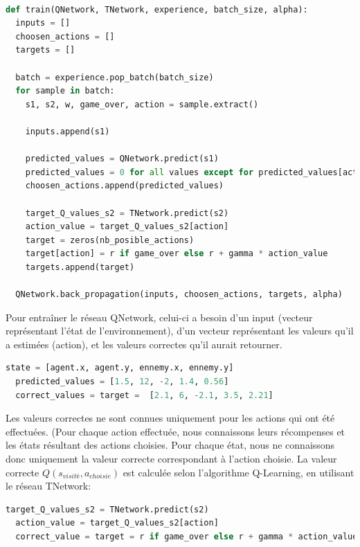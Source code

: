 \documentclass[11pt,a4paper]{report}
\begin{document}
  \begin{lstlisting}[language=python]
  
def train(QNetwork, TNetwork, experience, batch_size, alpha):
  inputs = []
  choosen_actions = []
  targets = []
 
  batch = experience.pop_batch(batch_size)
  for sample in batch:
    s1, s2, w, game_over, action = sample.extract()

    inputs.append(s1)
    
    predicted_values = QNetwork.predict(s1)
    predicted_values = 0 for all values except for predicted_values[action]
    choosen_actions.append(predicted_values)
    
    target_Q_values_s2 = TNetwork.predict(s2)
    action_value = target_Q_values_s2[action]
    target = zeros(nb_posible_actions)
    target[action] = r if game_over else r + gamma * action_value
    targets.append(target)
    
  QNetwork.back_propagation(inputs, choosen_actions, targets, alpha)
    \end{lstlisting} 
  
  \par Pour entraîner le réseau QNetwork, celui-ci a besoin d'un input (vecteur représentant l'état de l'environnement), d'un vecteur représentant les valeurs qu'il a estimées (action), et les valeurs correctes qu'il aurait retourner. 
  
  \begin{lstlisting}[language=python]
  state = [agent.x, agent.y, ennemy.x, ennemy.y]
  predicted_values = [1.5, 12, -2, 1.4, 0.56]
  correct_values = target =  [2.1, 6, -2.1, 3.5, 2.21]
  \end{lstlisting} 
  
  \par Les valeurs correctes ne sont connues uniquement pour les actions qui ont été effectuées. (Pour chaque action effectuée, nous connaissons leurs récompenses et les états résultant des actions choisies. Pour chaque état, nous ne connaissons donc uniquement la valeur correcte correspondant à l'action choisie. La valeur correcte $Q(s_{visité}, a_{choisie})$ est calculée selon l'algorithme Q-Learning, en utilisant le réseau TNetwork:
  
  \begin{lstlisting}[language=python]
  target_Q_values_s2 = TNetwork.predict(s2)
  action_value = target_Q_values_s2[action]
  correct_value = target = r if game_over else r + gamma * action_value
  \end{lstlisting}   
  
\end{document}
